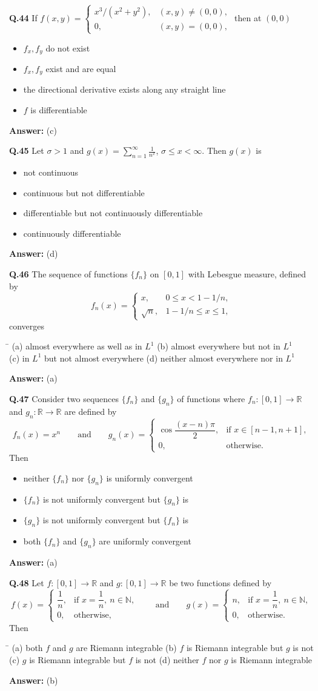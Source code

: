 \documentclass[11pt,a4paper]{article}
\newcommand{\optsfour}[4]{%
  \begin{tabbing}
    \hspace{0.48\linewidth}\=\kill
    (a) #1 \> (b) #2 \\[2pt]
    (c) #3 \> (d) #4
  \end{tabbing}%
}
\newcommand{\optslist}[4]{%
  \begin{itemize}
    \setlength{\itemsep}{2pt}\setlength{\parskip}{0pt}
    \item[(a)] #1
    \item[(b)] #2
    \item[(c)] #3
    \item[(d)] #4
  \end{itemize}%
}
\newcommand{\ans}[1]{\textbf{Answer:} #1\par\medskip}
\begin{document}
\textbf{Q.44} If $f(x,y) = \begin{cases} x^3/(x^2 + y^2), & (x,y) \ne (0,0), \\ 0, & (x,y) = (0,0), \end{cases}$ then at $(0,0)$
\optslist{$f_x, f_y$ do not exist}{$f_x, f_y$ exist and are equal}{the directional derivative exists along any straight line}{$f$ is differentiable}
\ans{(c)}

\textbf{Q.45} Let $\sigma > 1$ and $g(x) = \displaystyle\sum_{n=1}^{\infty} \frac{1}{n^x}$, $\sigma \le x < \infty$. Then $g(x)$ is
\optslist{not continuous}{continuous but not differentiable}{differentiable but not continuously differentiable}{continuously differentiable}
\ans{(d)}

\textbf{Q.46} The sequence of functions $\{f_n\}$ on $[0,1]$ with Lebesgue measure, defined by
\[
  f_n(x) = \begin{cases} x, & 0 \le x < 1 - 1/n, \\ \sqrt{n}, & 1 - 1/n \le x \le 1, \end{cases}
\]
converges
\optsfour{almost everywhere as well as in $L^1$}{almost everywhere but not in $L^1$}{in $L^1$ but not almost everywhere}{neither almost everywhere nor in $L^1$}
\ans{(a)}

\textbf{Q.47} Consider two sequences $\{f_n\}$ and $\{g_n\}$ of functions where $f_n : [0,1] \to \mathbb{R}$ and $g_n : \mathbb{R} \to \mathbb{R}$ are defined by
\[
  f_n(x) = x^n \qquad \text{and} \qquad g_n(x) = \begin{cases} \cos\dfrac{(x - n)\pi}{2}, & \text{if } x \in [n-1, n+1], \\ 0, & \text{otherwise.} \end{cases}
\]
Then
\optslist{neither $\{f_n\}$ nor $\{g_n\}$ is uniformly convergent}{$\{f_n\}$ is not uniformly convergent but $\{g_n\}$ is}{$\{g_n\}$ is not uniformly convergent but $\{f_n\}$ is}{both $\{f_n\}$ and $\{g_n\}$ are uniformly convergent}
\ans{(a)}

\textbf{Q.48} Let $f : [0,1] \to \mathbb{R}$ and $g : [0,1] \to \mathbb{R}$ be two functions defined by
\[
  f(x) = \begin{cases} \dfrac{1}{n}, & \text{if } x = \dfrac{1}{n},\ n \in \mathbb{N}, \\ 0, & \text{otherwise,} \end{cases}
  \qquad \text{and} \qquad
  g(x) = \begin{cases} n, & \text{if } x = \dfrac{1}{n},\ n \in \mathbb{N}, \\ 0, & \text{otherwise.} \end{cases}
\]
Then
\optsfour{both $f$ and $g$ are Riemann integrable}{$f$ is Riemann integrable but $g$ is not}{$g$ is Riemann integrable but $f$ is not}{neither $f$ nor $g$ is Riemann integrable}
\ans{(b)}
\end{document}
